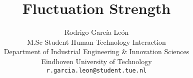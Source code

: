 \title{Fluctuation Strength}
\author{Rodrigo García León\\
        M.Sc Student Human-Technology Interaction\\
        Department of Industrial Engineering \& Innovation Sciences\\
        Eindhoven University of Technology\\
        \texttt{r.garcia.leon@student.tue.nl}}
